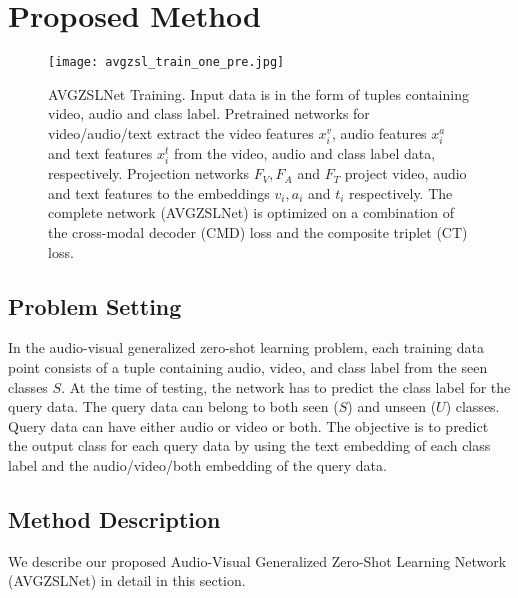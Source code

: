 \documentclass[10pt,twocolumn,letterpaper]{article}
\begin{document}
\section{Proposed Method}\label{sec:method}
\begin{figure}[t]
  \centering
  \texttt{[image: avgzsl\_train\_one\_pre.jpg]}
\caption{AVGZSLNet Training. Input data is in the form of tuples containing video, audio and class label. Pretrained networks for video/audio/text extract the video features $x_i^v$, audio features $x_i^a$ and text features $x_i^t$ from the video, audio and class label data, respectively. Projection networks $F_V,F_A$ and $F_T$ project video, audio and text features to the embeddings $v_i,a_i$ and $t_i$ respectively. The complete network (AVGZSLNet) is optimized on a combination of the cross-modal decoder (CMD) loss and the composite triplet (CT) loss.}
\label{fig:train}
  \vspace{-15pt}
\end{figure}


\subsection{Problem Setting}
In the audio-visual generalized zero-shot learning problem, each training data point consists of a tuple containing audio, video, and class label from the seen classes $S$. At the time of testing, the network has to predict the class label for the query data. The query data can belong to both seen ($S$) and unseen ($U$) classes. Query data can have either audio or video or both. The objective is to predict the output class for each query data by using the text embedding of each class label and the audio/video/both embedding of the query data.


\subsection{Method Description}
We describe our proposed Audio-Visual Generalized Zero-Shot Learning Network (AVGZSLNet) in detail in this section.
\end{document}
